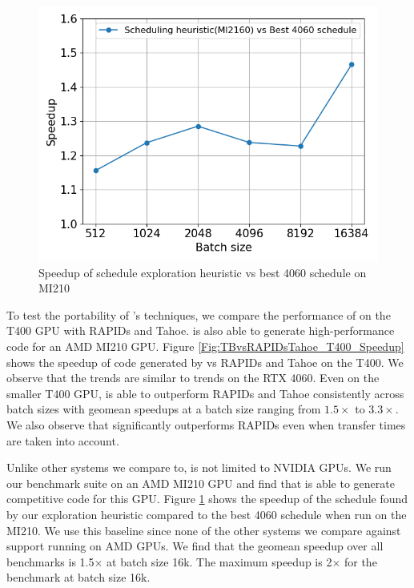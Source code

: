 \begin{figure}[htb]
  \centering
  \includegraphics[width=0.75\linewidth]{figures/geomean_speedup_AMDMI2160_4060_vs_MI2160.png}
  \caption{Speedup of schedule exploration heuristic vs best 4060 schedule on MI210}
  \label{Fig:AMD_MI210_ATHeuristicVs4060Sched_speedup}
\end{figure}

To test the portability of \Treebeard{}'s techniques, we compare the performance 
of \Treebeard{} on the T400 GPU with RAPIDs and Tahoe. \Treebeard{} is also 
able to generate high-performance code for an AMD MI210 GPU. Figure \ref{Fig:TBvsRAPIDsTahoe_T400_Speedup}
shows the speedup of code generated by \Treebeard{} vs RAPIDs and Tahoe on the T400.
We observe that the trends are similar to trends on the RTX 4060. Even on the smaller T400 GPU, \Treebeard{} is able to outperform RAPIDs
and Tahoe consistently across batch sizes with geomean speedups at a batch size ranging from $1.5\times$ to $3.3\times$.
We also observe that \Treebeard{} significantly outperforms RAPIDs even when transfer times are 
taken into account.

Unlike other systems we compare to, \Treebeard{} is not limited to NVIDIA GPUs. We 
run our benchmark suite on an AMD MI210 GPU and find that \Treebeard{} is able to
generate competitive code for this GPU. Figure \ref{Fig:AMD_MI210_ATHeuristicVs4060Sched_speedup}
shows the speedup of the schedule found by our exploration heuristic compared to the best 
4060 schedule when run on the MI210. We use this baseline since none of the other systems
we compare against support running on AMD GPUs. We find that the geomean speedup over all benchmarks is 1.5$\times$ at batch size 16k.
The maximum speedup is 2$\times$ for the  benchmark at batch size 16k. 

